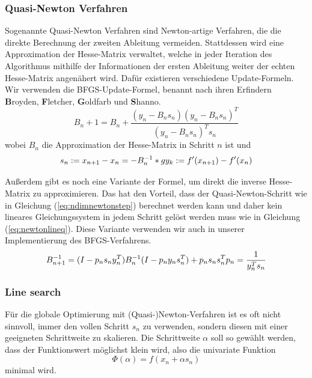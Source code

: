 \documentclass[runningheads,a4paper]{llncs}
\begin{document}
\subsubsection{Quasi-Newton Verfahren}
Sogenannte Quasi-Newton Verfahren sind Newton-artige Verfahren, die die direkte Berechnung der zweiten Ableitung vermeiden. Stattdessen wird eine Approximation der Hesse-Matrix verwaltet, welche in jeder Iteration des Algorithmus mithilfe der Informationen der ersten Ableitung weiter der echten Hesse-Matrix angenähert wird. Dafür existieren verschiedene Update-Formeln. Wir verwenden die BFGS-Update-Formel, benannt nach ihren Erfindern \textbf{B}royden, \textbf{F}letcher, \textbf{G}oldfarb und \textbf{S}hanno. \cite{nocedal1999numerical}
\begin{equation*}
B_n+1 = B_n + \frac{(y_n- B_ns_n) (y_n-B_ns_n)^T}{(y_n- B_n s_n)^T s_n}
\end{equation*}
wobei $B_n$ die Approximation der Hesse-Matrix in Schritt $n$ ist und
\begin{equation*}
s_n := x_{n+1} - x_n = -B_n^{-1}*g\\
y_k := f'(x_{n+1}) - f'(x_n)
\end{equation*}

Außerdem gibt es noch eine Variante der Formel, um direkt die inverse Hesse-Matrix zu approximieren. Das hat den Vorteil, dass der Quasi-Newton-Schritt wie in Gleichung (\ref{eq:ndimnewtonstep}) berechnet werden kann und daher kein lineares Gleichungssystem in jedem Schritt gelöst werden muss wie in Gleichung (\ref{eq:newtonlineq}). Diese Variante verwenden wir auch in unserer Implementierung des BFGS-Verfahrens.
\begin{equation}
\label{eq:bfgsinverse}
B_{n+1}^{-1} = (I - p_n s_n y_n^T) B_n^{-1} (I - p_n y_n s_n^T) + p_n s_n s_n^T \\ p_n = \frac{1}{y_n^Ts_n}
\end{equation}

\subsubsection{Line search}
Für die globale Optimierung mit (Quasi-)Newton-Verfahren ist es oft nicht sinnvoll, immer den vollen Schritt $s_n$ zu verwenden, sondern diesen mit einer geeigneten Schrittweite zu skalieren. Die Schrittweite $\alpha$ soll so gewählt werden, dass der Funktionswert möglichst klein wird, also die univariate Funktion
\begin{equation*}
\Phi(\alpha) = f(x_n + \alpha s_n)
\end{equation*}
minimal wird.
\end{document}
